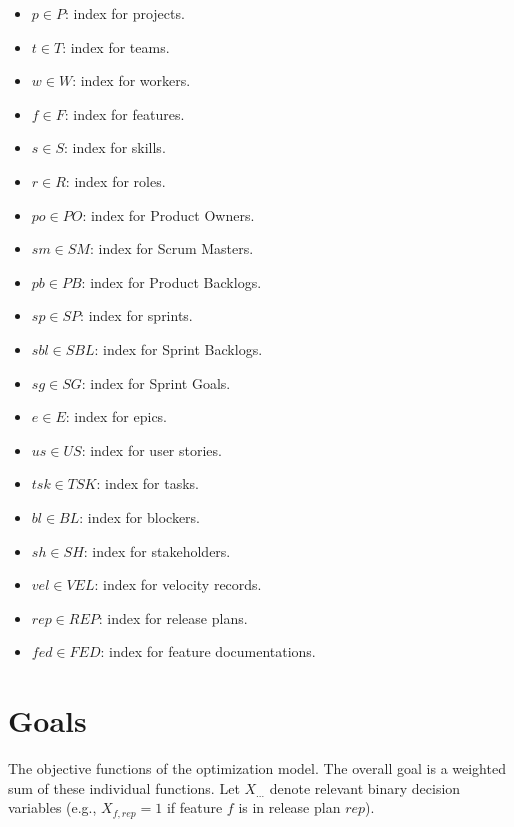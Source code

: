 \documentclass[11pt, a4paper]{article}
\begin{document}
\begin{itemize}
    \item $p \in P$: index for projects.
    \item $t \in T$: index for teams.
    \item $w \in W$: index for workers.
    \item $f \in F$: index for features.
    \item $s \in S$: index for skills.
    \item $r \in R$: index for roles.
    \item $po \in PO$: index for Product Owners.
    \item $sm \in SM$: index for Scrum Masters.
    \item $pb \in PB$: index for Product Backlogs.
    \item $sp \in SP$: index for sprints.
    \item $sbl \in SBL$: index for Sprint Backlogs.
    \item $sg \in SG$: index for Sprint Goals.
    \item $e \in E$: index for epics.
    \item $us \in US$: index for user stories.
    \item $tsk \in TSK$: index for tasks.
    \item $bl \in BL$: index for blockers.
    \item $sh \in SH$: index for stakeholders.
    \item $vel \in VEL$: index for velocity records.
    \item $rep \in REP$: index for release plans.
    \item $fed \in FED$: index for feature documentations.
\end{itemize}

\section{Goals}
The objective functions of the optimization model. The overall goal is a weighted sum of these individual functions. Let $X_{...}$ denote relevant binary decision variables (e.g., $X_{f,rep}=1$ if feature $f$ is in release plan $rep$).
\end{document}
